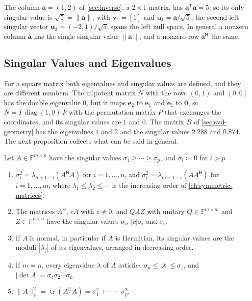 The column $\mathbf a=(1,2)$ of \cref{sec:inverse}, a $2\times1$ matrix, has $\mathbf a^{\mathsf T}\mathbf a=5$, so its only singular value is $\sqrt5=\|\mathbf a\|$, with $\mathbf v_1=[1]$ and $\mathbf u_1=\mathbf a/\sqrt5$; the second left singular vector $\mathbf u_2=(-2,1)/\sqrt5$ spans the left null space. In general a nonzero column $\mathbf a$ has the single singular value $\|\mathbf a\|$, and a nonzero row $\mathbf a^{\mathsf H}$ the same.

\subsection{Singular Values and Eigenvalues}

For a square matrix both eigenvalues and singular values are defined, and they are different numbers. The nilpotent matrix $N$ with the rows $(0,1)$ and $(0,0)$ has the double eigenvalue $0$, but it maps $\mathbf e_2$ to $\mathbf e_1$ and $\mathbf e_1$ to $\mathbf 0$, so $N=I\,\operatorname{diag}(1,0)\,P$ with the permutation matrix $P$ that exchanges the coordinates, and its singular values are $1$ and $0$. The matrix $B$ of \cref{sec:svd-geometry} has the eigenvalues $1$ and $2$ and the singular values $2.288$ and $0.874$. The next proposition collects what can be said in general.

\begin{proposition}
\label{prop:singular-eigen}
Let $A\in\mathbb F^{m\times n}$ have the singular values $\sigma_1\ge\cdots\ge\sigma_p$, and $\sigma_i\coloneqq0$ for $i>p$.
\begin{enumerate}
\item $\sigma_i^2=\lambda_{n+1-i}(A^{\mathsf H}A)$ for $i=1,\ldots,n$, and $\sigma_i^2=\lambda_{m+1-i}(AA^{\mathsf H})$ for $i=1,\ldots,m$, where $\lambda_1\le\lambda_2\le\cdots$ is the increasing order of \cref{ch:symmetric-matrices}.
\item The matrices $A^{\mathsf H}$, $cA$ with $c\ne0$, and $QAZ$ with unitary $Q\in\mathbb F^{m\times m}$ and $Z\in\mathbb F^{n\times n}$ have the singular values $\sigma_i$, $|c|\sigma_i$ and $\sigma_i$.
\item If $A$ is normal, in particular if $A$ is Hermitian, its singular values are the moduli $|\lambda_j|$ of its eigenvalues, arranged in decreasing order.
\item If $m=n$, every eigenvalue $\lambda$ of $A$ satisfies $\sigma_n\le|\lambda|\le\sigma_1$, and $|\det A|=\sigma_1\sigma_2\cdots\sigma_n$.
\item $\|A\|_{\mathrm F}^2=\operatorname{tr}(A^{\mathsf H}A)=\sigma_1^2+\cdots+\sigma_p^2$.
\end{enumerate}
\end{proposition}

